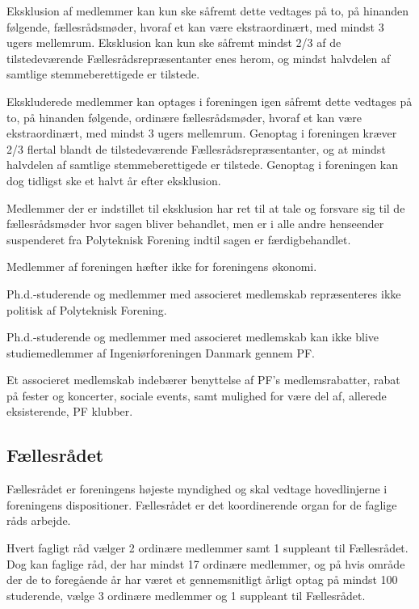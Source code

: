 \begin{list}
Eksklusion af medlemmer kan kun ske såfremt dette vedtages på to, på hinanden følgende, fællesrådsmøder, hvoraf et kan være ekstraordinært, med mindst 3 ugers mellemrum. Eksklusion kan kun ske såfremt mindst 2/3 af de tilstedeværende Fællesrådsrepræsentanter enes herom, og mindst halvdelen af
samtlige stemmeberettigede er tilstede.

Ekskluderede medlemmer kan optages i foreningen igen såfremt dette vedtages på to, på hinanden følgende, ordinære fællesrådsmøder, hvoraf et kan være ekstraordinært, med mindst 3 ugers mellemrum. Genoptag i foreningen kræver 2/3 flertal blandt de tilstedeværende Fællesrådsrepræsentanter, og at mindst halvdelen af samtlige stemmeberettigede er tilstede. Genoptag i foreningen kan dog tidligst ske et halvt år efter eksklusion.

Medlemmer der er indstillet til eksklusion har ret til at tale og forsvare sig til de fællesrådsmøder hvor sagen bliver behandlet, men er i alle andre henseender suspenderet fra Polyteknisk Forening indtil sagen er færdigbehandlet.
\item Medlemmer af foreningen hæfter ikke for foreningens økonomi.

\item \label{L:medlem:PHD} Ph.d.-studerende og medlemmer med associeret medlemskab repræsenteres ikke politisk af Polyteknisk Forening.

Ph.d.-studerende og medlemmer med associeret medlemskab kan ikke blive studiemedlemmer af Ingeniørforeningen Danmark gennem PF.

\item Et associeret medlemskab indebærer benyttelse af PF’s medlemsrabatter, rabat på fester og koncerter, sociale events, samt mulighed for være del af, allerede eksisterende, PF klubber.

\subsection{Fællesrådet}	
\label{L:kap:faellesraadet}
\item Fællesrådet er foreningens højeste myndighed og skal vedtage hovedlinjerne i foreningens dispositioner. Fællesrådet er det koordinerende organ for de faglige råds arbejde.

\item \label{L:FR:ValgtilFR} Hvert fagligt råd vælger 2 ordinære medlemmer samt 1 suppleant til Fællesrådet. Dog kan faglige råd, der har mindst 17 ordinære medlemmer, og på hvis område der de to foregående år har været et gennemsnitligt årligt optag på mindst 100 studerende, vælge 3 ordinære medlemmer og 1 suppleant til Fællesrådet.\\


\end{list}
